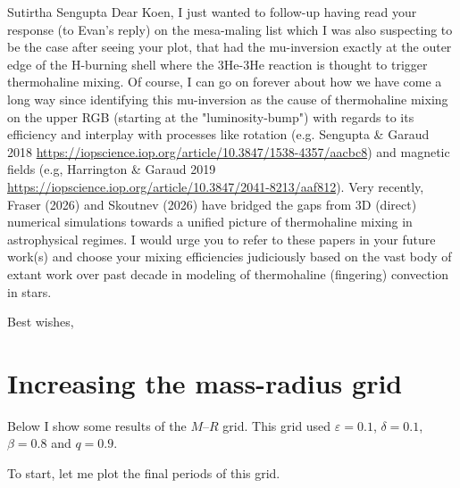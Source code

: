 \documentclass[a4paper,10pt]{article}
\begin{document}
\hspace{0.2\textwidth}\begin{minipage}{1.35\textwidth}
	\begin{shadequote}{Sutirtha Sengupta}
		Dear Koen,
		I just wanted to follow-up having read your response (to Evan's reply) on the mesa-maling list which I was also suspecting to be the case after seeing your plot, that had the mu-inversion exactly at the outer edge of the H-burning shell where the 3He-3He reaction is thought to trigger thermohaline mixing.
		Of course, I can go on forever about how we have come a long way since identifying this mu-inversion as the cause of thermohaline mixing on the upper RGB (starting at the "luminosity-bump") with regards to its efficiency and interplay with processes like rotation (e.g. Sengupta \& Garaud 2018 \url{https://iopscience.iop.org/article/10.3847/1538-4357/aacbc8}) and magnetic fields (e.g, Harrington \& Garaud 2019 \url{https://iopscience.iop.org/article/10.3847/2041-8213/aaf812}).
		Very recently, Fraser (2026) and Skoutnev (2026) have bridged the gaps from 3D (direct) numerical simulations towards a unified picture of thermohaline mixing in astrophysical regimes.
		I would urge you to refer to these papers in your future work(s) and choose your mixing efficiencies judiciously based on the vast body of extant work over past decade in modeling of thermohaline (fingering) convection in stars.

		Best wishes,
	\end{shadequote}
\end{minipage}

\section{Increasing the mass-radius grid}

\begin{figure}[ht]
	\centering
\end{figure}


Below I show some results of the \(M\)--\(R\) grid.
This grid used \(\varepsilon =0.1\), \(\delta = 0.1\),
\(\beta =0.8\) and \(q=0.9\).

To start, let me plot the final periods of this grid.
\begin{figure}[ht]
	\centering
\end{figure}

\begin{figure}[ht]
	\centering
\end{figure}
\end{document}

